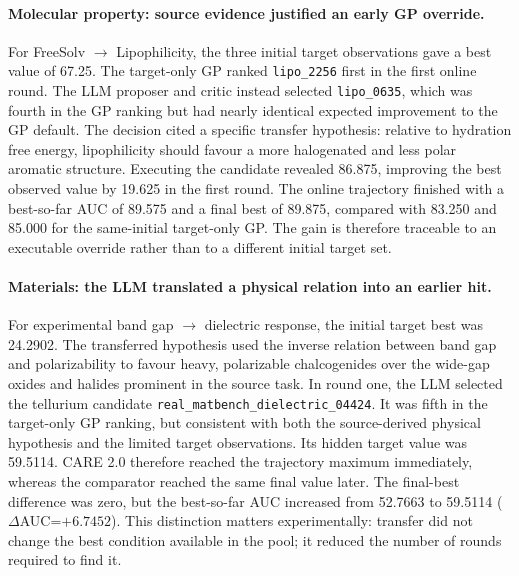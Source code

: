 \paragraph{Molecular property: source evidence justified an early GP override.}
For FreeSolv $\rightarrow$ Lipophilicity, the three initial target observations
gave a best value of 67.25. The target-only GP ranked
\texttt{lipo\_2256} first in the first online round. The LLM proposer and critic
instead selected \texttt{lipo\_0635}, which was fourth in the GP ranking but had
nearly identical expected improvement to the GP default. The decision cited a
specific transfer hypothesis: relative to hydration free energy, lipophilicity
should favour a more halogenated and less polar aromatic structure. Executing
the candidate revealed 86.875, improving the best observed value by 19.625 in
the first round. The online trajectory finished with a best-so-far AUC of
89.575 and a final best of 89.875, compared with 83.250 and 85.000 for the
same-initial target-only GP. The gain is therefore traceable to an executable
override rather than to a different initial target set.

\paragraph{Materials: the LLM translated a physical relation into an earlier hit.}
For experimental band gap $\rightarrow$ dielectric response, the initial target
best was 24.2902. The transferred hypothesis used the inverse relation between
band gap and polarizability to favour heavy, polarizable chalcogenides over the
wide-gap oxides and halides prominent in the source task. In round one, the LLM
selected the tellurium candidate
\texttt{real\_matbench\_dielectric\_04424}. It was fifth in the target-only GP
ranking, but consistent with both the source-derived physical hypothesis and
the limited target observations. Its hidden target value was 59.5114. CARE 2.0
therefore reached the trajectory maximum immediately, whereas the comparator
reached the same final value later. The final-best difference was zero, but the
best-so-far AUC increased from 52.7663 to 59.5114
($\Delta$AUC=$+6.7452$). This distinction matters experimentally: transfer did
not change the best condition available in the pool; it reduced the number of
rounds required to find it.

